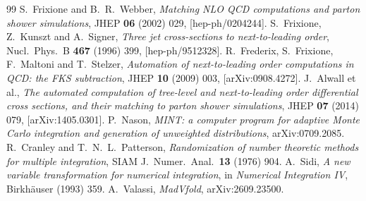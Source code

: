 \documentclass[11pt,a4paper]{article}
\begin{document}
\begin{thebibliography}{99}
S.~Frixione and B.~R.~Webber, \emph{Matching NLO QCD computations and parton shower
simulations}, JHEP \textbf{06} (2002) 029, [hep-ph/0204244].
S.~Frixione, Z.~Kunszt and A.~Signer, \emph{Three jet cross-sections to next-to-leading
order}, Nucl.\ Phys.\ B \textbf{467} (1996) 399, [hep-ph/9512328].
R.~Frederix, S.~Frixione, F.~Maltoni and T.~Stelzer, \emph{Automation of next-to-leading
order computations in QCD: the FKS subtraction}, JHEP \textbf{10} (2009) 003,
[arXiv:0908.4272].
J.~Alwall et al., \emph{The automated computation of tree-level and next-to-leading order
differential cross sections, and their matching to parton shower simulations},
JHEP \textbf{07} (2014) 079, [arXiv:1405.0301].
P.~Nason, \emph{MINT: a computer program for adaptive Monte Carlo integration and generation
of unweighted distributions}, arXiv:0709.2085.
R.~Cranley and T.~N.~L.~Patterson, \emph{Randomization of number theoretic methods for
multiple integration}, SIAM J.\ Numer.\ Anal.\ \textbf{13} (1976) 904.
A.~Sidi, \emph{A new variable transformation for numerical integration}, in
\emph{Numerical Integration IV}, Birkh\"auser (1993) 359.
A.~Valassi, \emph{MadVfold}, arXiv:2609.23500.
\end{thebibliography}
\end{document}

